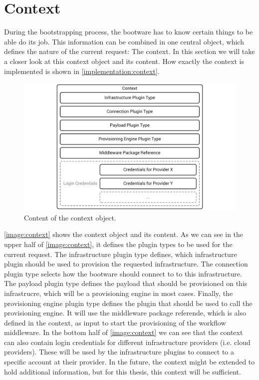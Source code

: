 \section{Context}
\label{design:context}

During the bootstrapping process, the bootware has to know certain things to be able do its job.
This information can be combined in one central object, which defines the nature of the current request: The context.
In this section we will take a closer look at this context object and its content.
How exactly the context is implemented is shown in \autoref{implementation:context}.

\begin{figure}[!htbp]
	\centering
	\includegraphics[resolution=600]{design/assets/context}
	\caption{Content of the context object.}
	\label{image:context}
\end{figure}

\autoref{image:context} shows the context object and its content.
As we can see in the upper half of \autoref{image:context}, it defines the plugin types to be used for the current request.
The infrastructure plugin type defines, which infrastructure plugin should be used to provision the requested infrastructure.
The connection plugin type selects how the bootware should connect to to this infrastructure.
The payload plugin type defines the payload that should be provisioned on this infrastrucre, which will be a provisioning engine in most cases.
Finally, the provisioning engine plugin type defines the plugin that should be used to call the provisioning engine.
It will use the middleware package referende, which is also defined in the context, as input to start the provisioning of the workflow middleware.
In the bottom half of \autoref{image:context} we can see that the context can also contain login credentials for different infrastructure providers (i.e. cloud providers).
These will be used by the infrastructure plugins to connect to a specific account at their provider.
In the future, the context might be extended to hold additional information, but for this thesis, this context will be sufficient.

